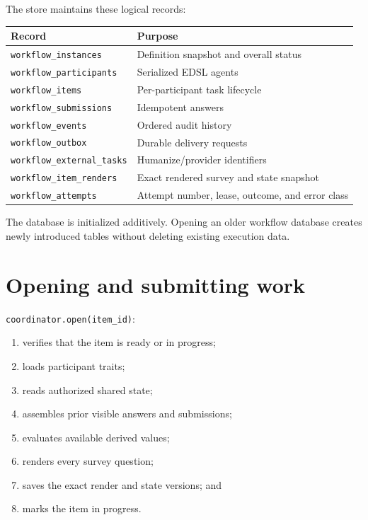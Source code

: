 \documentclass[
  10pt,
]{report}
\providecommand{\tightlist}{%
  \setlength{\itemsep}{0pt}\setlength{\parskip}{0pt}}
\begin{document}
The store maintains these logical records:

\begin{longtable}[]{@{}
  >{\raggedright\arraybackslash}p{}
  >{\raggedright\arraybackslash}p{}@{}}
\toprule\noalign{}
\begin{minipage}[b]{\linewidth}\raggedright
Record
\end{minipage} & \begin{minipage}[b]{\linewidth}\raggedright
Purpose
\end{minipage} \\
\midrule\noalign{}
\endhead
\bottomrule\noalign{}
\endlastfoot
\texttt{workflow\_instances} & Definition snapshot and overall status \\
\texttt{workflow\_participants} & Serialized EDSL agents \\
\texttt{workflow\_items} & Per-participant task lifecycle \\
\texttt{workflow\_submissions} & Idempotent answers \\
\texttt{workflow\_events} & Ordered audit history \\
\texttt{workflow\_outbox} & Durable delivery requests \\
\texttt{workflow\_external\_tasks} & Humanize/provider identifiers \\
\texttt{workflow\_item\_renders} & Exact rendered survey and state
snapshot \\
\texttt{workflow\_attempts} & Attempt number, lease, outcome, and error
class \\
\end{longtable}

The database is initialized additively. Opening an older workflow
database creates newly introduced tables without deleting existing
execution data.

\chapter{Opening and submitting work}\label{opening-and-submitting-work}

\texttt{coordinator.open(item\_id)}:

\begin{enumerate}
\def\labelenumi{\arabic{enumi}.}
\tightlist
\item
  verifies that the item is ready or in progress;
\item
  loads participant traits;
\item
  reads authorized shared state;
\item
  assembles prior visible answers and submissions;
\item
  evaluates available derived values;
\item
  renders every survey question;
\item
  saves the exact render and state versions; and
\item
  marks the item in progress.
\end{enumerate}
\end{document}
